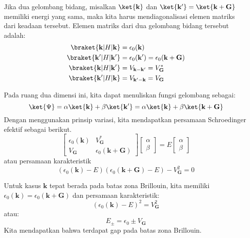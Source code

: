 Jika dua gelombang bidang, misalkan $\ket{\mathbf{k}}$ dan
$\ket{\mathbf{k}'} = \ket{\mathbf{k} + \mathbf{G}}$
memiliki energi yang sama, maka kita harus mendiagonalisasi elemen matriks
dari keadaan tersebut.
Elemen matriks dari dua gelombang bidang tersebut adalah:
\begin{align*}
\braket{\mathbf{k} | H | \mathbf{k}} & = \epsilon_{0}(\mathbf{k}) \\
\braket{\mathbf{k}' | H | \mathbf{k}'} & = \epsilon_{0}(\mathbf{k}') =
\epsilon_{0}(\mathbf{k} + \mathbf{G}) \\
\braket{\mathbf{k} | H | \mathbf{k}'} & = V_{\mathbf{k}-\mathbf{k}'} =
V^{*}_{\mathbf{G}} \\
\braket{\mathbf{k}' | H | \mathbf{k}} & = V_{\mathbf{k}'-\mathbf{k}} =
V_{\mathbf{G}}
\end{align*}

Pada ruang dua dimensi ini, kita dapat menuliskan fungsi gelombang sebagai:
\begin{equation}
\ket{\Psi} = \alpha \ket{\mathbf{k}} + \beta \ket{\mathbf{k}'} =
\alpha \ket{\mathbf{k}} + \beta \ket{\mathbf{k} + \mathbf{G}}
\end{equation}
Dengan menggunakan prinsip variasi, kita mendapatkan persamaan Schroedinger efektif
sebagai berikut.
\begin{equation}
\begin{bmatrix}
\epsilon_{0}(\mathbf{k}) & V_{\mathbf{G}}^{*} \\
V_{\mathbf{G}} & \epsilon_{0}(\mathbf{k} + \mathbf{G})
\end{bmatrix}
\begin{bmatrix} \alpha \\ \beta \end{bmatrix} =
E \begin{bmatrix} \alpha \\ \beta \end{bmatrix}
\end{equation}
atau persamaan karakteristik
\begin{equation}
\left( \epsilon_{0}(\mathbf{k}) - E \right)
\left( \epsilon_{0}(\mathbf{k} + \mathbf{G}) - E \right) - 
V_{\mathbf{G}}^{2} = 0
\end{equation}

Untuk kasus $\mathbf{k}$ tepat berada pada batas zona Brillouin, kita
memiliki $\epsilon_{0}(\mathbf{k}) = \epsilon_{0}(\mathbf{k} + \mathbf{G})$
dan persamaan karakteristik:
\begin{equation}
\left( \epsilon_{0}(\mathbf{k}) - E \right)^2 = V_{\mathbf{G}}^2
\end{equation}
atau:
\begin{equation}
E_{\pm} = \epsilon_{0} \pm V_{\mathbf{G}}
\end{equation}
Kita mendapatkan bahwa terdapat gap pada batas zona Brillouin.

